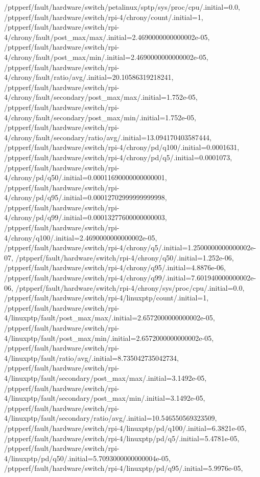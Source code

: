 {    /ptpperf/fault/hardware/switch/petalinux/sptp/sys/proc/cpu/.initial=0.0,
    /ptpperf/fault/hardware/switch/rpi-4/chrony/count/.initial=1,
    /ptpperf/fault/hardware/switch/rpi-4/chrony/fault/post_max/max/.initial=2.4690000000000002e-05,
    /ptpperf/fault/hardware/switch/rpi-4/chrony/fault/post_max/min/.initial=2.4690000000000002e-05,
    /ptpperf/fault/hardware/switch/rpi-4/chrony/fault/ratio/avg/.initial=20.10586319218241,
    /ptpperf/fault/hardware/switch/rpi-4/chrony/fault/secondary/post_max/max/.initial=1.752e-05,
    /ptpperf/fault/hardware/switch/rpi-4/chrony/fault/secondary/post_max/min/.initial=1.752e-05,
    /ptpperf/fault/hardware/switch/rpi-4/chrony/fault/secondary/ratio/avg/.initial=13.094170403587444,
    /ptpperf/fault/hardware/switch/rpi-4/chrony/pd/q100/.initial=0.0001631,
    /ptpperf/fault/hardware/switch/rpi-4/chrony/pd/q5/.initial=0.0001073,
    /ptpperf/fault/hardware/switch/rpi-4/chrony/pd/q50/.initial=0.00011690000000000001,
    /ptpperf/fault/hardware/switch/rpi-4/chrony/pd/q95/.initial=0.00012702999999999998,
    /ptpperf/fault/hardware/switch/rpi-4/chrony/pd/q99/.initial=0.00013277600000000003,
    /ptpperf/fault/hardware/switch/rpi-4/chrony/q100/.initial=2.4690000000000002e-05,
    /ptpperf/fault/hardware/switch/rpi-4/chrony/q5/.initial=1.2500000000000002e-07,
    /ptpperf/fault/hardware/switch/rpi-4/chrony/q50/.initial=1.252e-06,
    /ptpperf/fault/hardware/switch/rpi-4/chrony/q95/.initial=4.8876e-06,
    /ptpperf/fault/hardware/switch/rpi-4/chrony/q99/.initial=7.601940000000002e-06,
    /ptpperf/fault/hardware/switch/rpi-4/chrony/sys/proc/cpu/.initial=0.0,
    /ptpperf/fault/hardware/switch/rpi-4/linuxptp/count/.initial=1,
    /ptpperf/fault/hardware/switch/rpi-4/linuxptp/fault/post_max/max/.initial=2.6572000000000002e-05,
    /ptpperf/fault/hardware/switch/rpi-4/linuxptp/fault/post_max/min/.initial=2.6572000000000002e-05,
    /ptpperf/fault/hardware/switch/rpi-4/linuxptp/fault/ratio/avg/.initial=8.735042735042734,
    /ptpperf/fault/hardware/switch/rpi-4/linuxptp/fault/secondary/post_max/max/.initial=3.1492e-05,
    /ptpperf/fault/hardware/switch/rpi-4/linuxptp/fault/secondary/post_max/min/.initial=3.1492e-05,
    /ptpperf/fault/hardware/switch/rpi-4/linuxptp/fault/secondary/ratio/avg/.initial=10.546550569323509,
    /ptpperf/fault/hardware/switch/rpi-4/linuxptp/pd/q100/.initial=6.3821e-05,
    /ptpperf/fault/hardware/switch/rpi-4/linuxptp/pd/q5/.initial=5.4781e-05,
    /ptpperf/fault/hardware/switch/rpi-4/linuxptp/pd/q50/.initial=5.7093000000000004e-05,
    /ptpperf/fault/hardware/switch/rpi-4/linuxptp/pd/q95/.initial=5.9976e-05,
}
